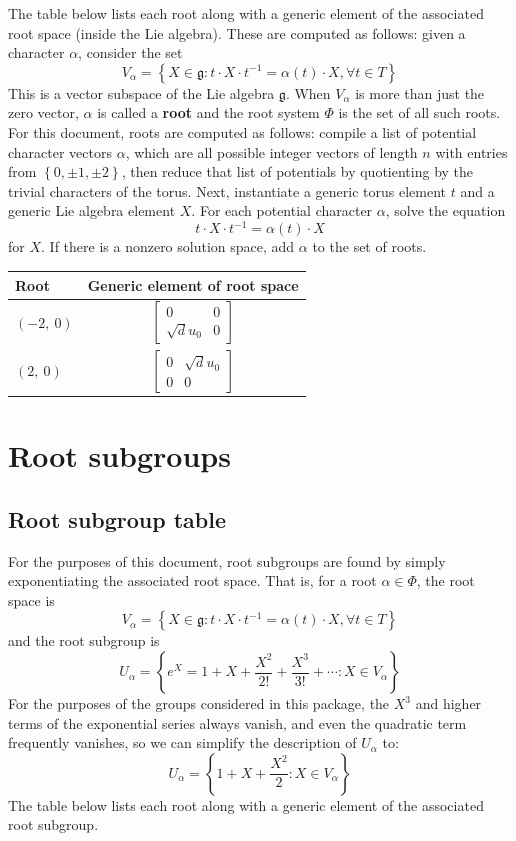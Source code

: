 \documentclass[11pt]{article}
\newcommand{\noi}{\noindent}
\newcommand{\tbf}{\textbf}
\newcommand{\inv}{^{-1}}
\newcommand{\lb}{\left\{}
\newcommand{\rb}{\right\}}
\newcommand{\frakg}{\mathfrak{g}}
\theoremstyle{definition}
\begin{document}
\noi The table below lists each root along with a generic element of the associated root space (inside the Lie algebra). These are computed as follows: given a character $\alpha$, consider the set
\[
	V_\alpha = \lb X \in \frakg : t \cdot X \cdot t \inv = \alpha(t) \cdot X, \forall t \in T \rb
\]
This is a vector subspace of the Lie algebra $\frakg$. When $V_\alpha$ is more than just the zero vector, $\alpha$ is called a \tbf{root} and the root system $\Phi$ is the set of all such roots. For this document, roots are computed as follows: compile a list of potential character vectors $\alpha$, which are all possible integer vectors of length $n$ with entries from $\lb 0, \pm 1, \pm 2 \rb$, then reduce that list of potentials by quotienting by the trivial characters of the torus. Next, instantiate a generic torus element $t$ and a generic Lie algebra element $X$. For each potential character $\alpha$, solve the equation
\[
	t \cdot X \cdot t \inv = \alpha(t) \cdot X
\]
for $X$. If there is a nonzero solution space, add $\alpha$ to the set of roots.

\bigskip

\noindent \begin{longtable}{|l|c|}
    \hline
    \textbf{Root} & \textbf{Generic element of root space} \\
    \hline
    \endhead
    $\left( -2, \  0\right)$ & ${\left[\begin{matrix}0 & 0\\\sqrt{d} u_{0} & 0\end{matrix}\right]}$ \\
    \hline
    $\left( 2, \  0\right)$ & ${\left[\begin{matrix}0 & \sqrt{d} u_{0}\\0 & 0\end{matrix}\right]}$ \\
    \hline
\end{longtable}


\newpage
\section{Root subgroups}

\subsection{Root subgroup table}

\noi For the purposes of this document, root subgroups are found by simply exponentiating the associated root space. That is, for a root $\alpha \in \Phi$, the root space is
\[
	V_\alpha = \lb X \in \frakg : t \cdot X \cdot t \inv = \alpha(t) \cdot X, \forall t \in T \rb
\]
and the root subgroup is
\[
	U_\alpha = \lb e^X = 1 + X + \frac{X^2}{2!} + \frac{X^3}{3!} + \cdots : X \in V_\alpha \rb
\]
For the purposes of the groups considered in this package, the $X^3$ and higher terms of the exponential series always vanish, and even the quadratic term frequently vanishes, so we can simplify the description of $U_\alpha$ to:
\[
	U_\alpha = \lb 1 + X + \frac{X^2}{2} : X \in V_\alpha \rb
\]
The table below lists each root along with a generic element of the associated root subgroup.
\end{document}
